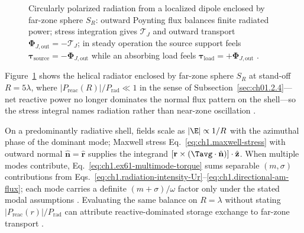 \begin{figure}[t]
\centering
{}
\caption{Circularly polarized radiation from a localized dipole enclosed by far-zone sphere $S_R$: outward Poynting flux balances finite radiated power; stress integration gives $\boldsymbol{\mathcal{T}}_J$ and outward transport $\boldsymbol{\Phi}_{J,\mathrm{out}}=-\boldsymbol{\mathcal{T}}_J$; in steady operation the source support feels $\boldsymbol{\tau}_{\mathrm{source}}=-\boldsymbol{\Phi}_{J,\mathrm{out}}$ while an absorbing load feels $\boldsymbol{\tau}_{\mathrm{load}}=+\boldsymbol{\Phi}_{J,\mathrm{out}}$ \cite{beth1936,stratton1941}.}
\label{fig:ch1.ex61-beth-helical-sketch}
\end{figure}

Figure~\ref{fig:ch1.ex61-beth-helical-sketch} shows the helical radiator enclosed by far-zone sphere $S_R$ at stand-off \(R=5\lambda\), where
\(|P_{\mathrm{reac}}(R)|/P_{\mathrm{rad}}\ll 1\) in the sense of Subsection~\ref{sec:ch01.2.4}---net reactive power no longer dominates the normal flux pattern on the shell---so the stress integral names radiation rather than
near-zone oscillation \cite{stratton1941}.

On a predominantly radiative shell, fields scale as \(|\E|\propto 1/R\) with the azimuthal phase of the dominant mode; Maxwell stress Eq.~\eqref{eq:ch1.maxwell-stress} with outward normal \(\hat{\mathbf{n}}=\hat{\mathbf{r}}\) supplies the integrand \([\mathbf{r}\times(\Tavg\cdot\hat{\mathbf{n}})]\cdot\hat{\mathbf{z}}\). When multiple modes contribute, Eq.~\eqref{eq:ch1.ex61-multimode-torque} sums separable \((m,\sigma)\) contributions from Eqs.~\eqref{eq:ch1.radiation-intensity-Ur}--\eqref{eq:ch1.directional-am-flux}; each mode carries a definite \((m+\sigma)/\omega\) factor only under the stated modal assumptions \cite{stratton1941}. Evaluating the same balance on \(R=\lambda\) without stating \(|P_{\mathrm{reac}}(r)|/P_{\mathrm{rad}}\) can attribute reactive-dominated storage exchange to far-zone transport \cite{stratton1941}.

